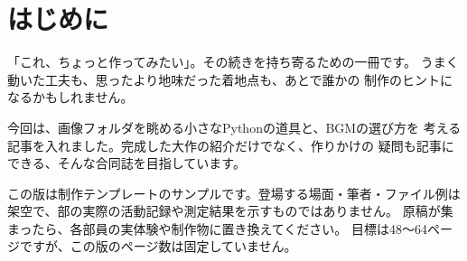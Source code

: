 \chapter{はじめに}
「これ、ちょっと作ってみたい」。その続きを持ち寄るための一冊です。
うまく動いた工夫も、思ったより地味だった着地点も、あとで誰かの
制作のヒントになるかもしれません。

今回は、画像フォルダを眺める小さなPythonの道具と、BGMの選び方を
考える記事を入れました。完成した大作の紹介だけでなく、作りかけの
疑問も記事にできる、そんな合同誌を目指しています。

この版は制作テンプレートのサンプルです。登場する場面・筆者・ファイル例は
架空で、部の実際の活動記録や測定結果を示すものではありません。
原稿が集まったら、各部員の実体験や制作物に置き換えてください。
目標は48〜64ページですが、この版のページ数は固定していません。
